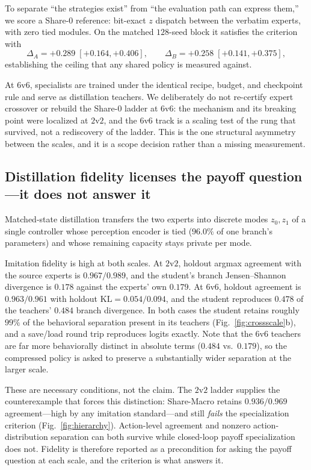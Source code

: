 To separate ``the strategies exist'' from ``the evaluation path can express
them,'' we score a Share-0 reference: bit-exact $z$ dispatch between the verbatim
experts, with zero tied modules. On the matched $128$-seed block it satisfies the
criterion with
\[
\Delta_A = +0.289\;[+0.164,+0.406],
\qquad
\Delta_B = +0.258\;[+0.141,+0.375],
\]
establishing the ceiling that any shared policy is measured against.

At $6$v$6$, specialists are trained under the identical recipe, budget, and
checkpoint rule and serve as distillation teachers. We deliberately do not
re-certify expert crossover or rebuild the Share-0 ladder at $6$v$6$: the
mechanism and its breaking point were localized at $2$v$2$, and the $6$v$6$ track
is a scaling test of the rung that survived, not a rediscovery of the ladder.
This is the one structural asymmetry between the scales, and it is a scope
decision rather than a missing measurement.

\subsection{Distillation fidelity licenses the payoff question---it does not
answer it}
\label{sec:results-fidelity}

Matched-state distillation transfers the two experts into discrete modes $z_0,z_1$
of a single controller whose perception encoder is tied ($96.0\%$ of one branch's
parameters) and whose remaining capacity stays private per mode.

Imitation fidelity is high at both scales. At $2$v$2$, holdout argmax agreement
with the source experts is $0.967/0.989$, and the student's branch
Jensen--Shannon divergence is $0.178$ against the experts' own $0.179$. At
$6$v$6$, holdout agreement is $0.963/0.961$ with holdout
$\mathrm{KL}=0.054/0.094$, and the student reproduces $0.478$ of the teachers'
$0.484$ branch divergence. In both cases the student retains roughly $99\%$ of the
behavioral separation present in its teachers (Fig.~\ref{fig:crossscale}b), and a
save/load round trip reproduces logits exactly. Note that the $6$v$6$ teachers are
far more behaviorally distinct in absolute terms ($0.484$ vs.\ $0.179$), so the
compressed policy is asked to preserve a substantially wider separation at the
larger scale.

These are necessary conditions, not the claim. The $2$v$2$ ladder supplies the
counterexample that forces this distinction: Share-Macro retains $0.936/0.969$
agreement---high by any imitation standard---and still \emph{fails} the
specialization criterion (Fig.~\ref{fig:hierarchy}). Action-level agreement and
nonzero action-distribution separation can both survive while closed-loop payoff
specialization does not. Fidelity is therefore reported as a precondition for
asking the payoff question at each scale, and the criterion is what answers it.

